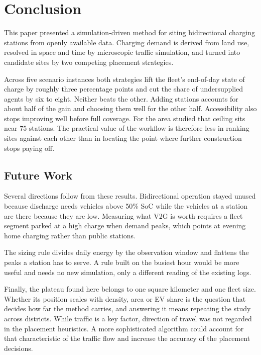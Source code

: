 \section{Conclusion}
\label{sec:conclusion}
This paper presented a simulation-driven method for siting bidirectional charging stations from openly available data. Charging demand is derived from land use, resolved in space and time by microscopic traffic simulation, and turned into candidate sites by two competing placement strategies.

Across five scenario instances both strategies lift the fleet's end-of-day state of charge by roughly three percentage points and cut the share of undersupplied agents by six to eight. Neither beats the other. Adding stations accounts for about half of the gain and choosing them well for the other half. Accessibility also stops improving well before full coverage. For the area studied that ceiling sits near 75 stations. The practical value of the workflow is therefore less in ranking sites against each other than in locating the point where further construction stops paying off.

\subsection{Future Work}
Several directions follow from these results. Bidirectional operation stayed unused because discharge needs vehicles above 50\% \ac{SoC} while the vehicles at a station are there because they are low. Measuring what \ac{V2G} is worth requires a fleet segment parked at a high charge when demand peaks, which points at evening home charging rather than public stations.

The sizing rule divides daily energy by the observation window and flattens the peaks a station has to serve. A rule built on the busiest hour would be more useful and needs no new simulation, only a different reading of the existing logs.

Finally, the plateau found here belongs to one square kilometer and one fleet size. Whether its position scales with density, area or \ac{EV} share is the question that decides how far the method carries, and answering it means repeating the study across districts. While traffic is a key factor, direction of travel was not regarded in the placement heuristics. A more sophisticated algorithm could account for that characteristic of the traffic flow and increase the accuracy of the placement decisions.